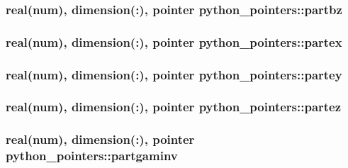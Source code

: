 \subsubsection[{\texorpdfstring{partbz}{partbz}}]{\setlength{\rightskip}{0pt plus 5cm}real(num), dimension(\+:), pointer python\+\_\+pointers\+::partbz}\hypertarget{namespacepython__pointers_a9c50a4b64ff01114243eebc0dc729ae8}{}\label{namespacepython__pointers_a9c50a4b64ff01114243eebc0dc729ae8}
\subsubsection[{\texorpdfstring{partex}{partex}}]{\setlength{\rightskip}{0pt plus 5cm}real(num), dimension(\+:), pointer python\+\_\+pointers\+::partex}\hypertarget{namespacepython__pointers_ad4fc57017cff184e92ae60ff0006c62c}{}\label{namespacepython__pointers_ad4fc57017cff184e92ae60ff0006c62c}
\subsubsection[{\texorpdfstring{partey}{partey}}]{\setlength{\rightskip}{0pt plus 5cm}real(num), dimension(\+:), pointer python\+\_\+pointers\+::partey}\hypertarget{namespacepython__pointers_af358e4be4f10aeff30df94181589c382}{}\label{namespacepython__pointers_af358e4be4f10aeff30df94181589c382}
\subsubsection[{\texorpdfstring{partez}{partez}}]{\setlength{\rightskip}{0pt plus 5cm}real(num), dimension(\+:), pointer python\+\_\+pointers\+::partez}\hypertarget{namespacepython__pointers_a61f858897e873f37d7bb3e355e2b9740}{}\label{namespacepython__pointers_a61f858897e873f37d7bb3e355e2b9740}
\subsubsection[{\texorpdfstring{partgaminv}{partgaminv}}]{\setlength{\rightskip}{0pt plus 5cm}real(num), dimension(\+:), pointer python\+\_\+pointers\+::partgaminv}\hypertarget{namespacepython__pointers_a072266fc5f086ac68bdb72332b296a07}{}\label{namespacepython__pointers_a072266fc5f086ac68bdb72332b296a07}
